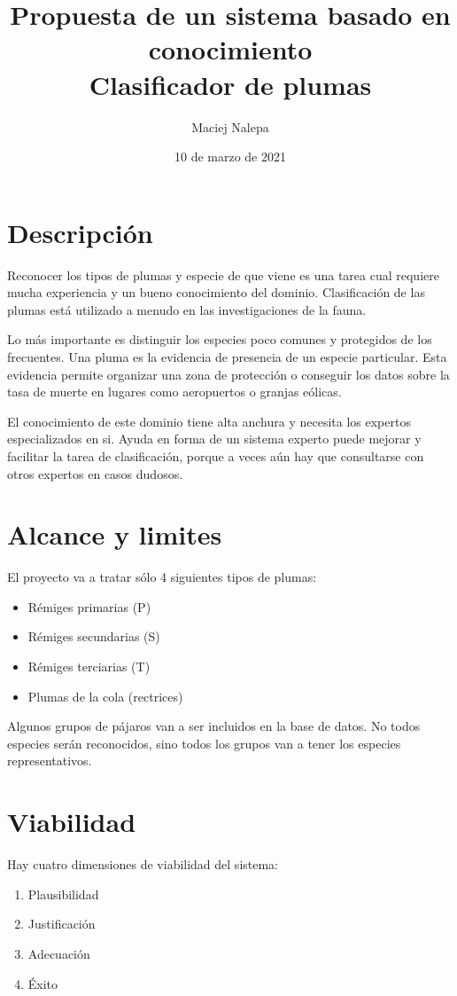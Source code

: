 \documentclass[a4paper,12pt]{article}
\title{Propuesta de un sistema basado en conocimiento\\ \normalsize{Clasificador de plumas}}
\author{Maciej Nalepa}
\date{10 de marzo de 2021}
\begin{document}
\maketitle

\section{Descripción}
Reconocer los tipos de plumas y especie de que viene es una tarea cual requiere mucha experiencia y un bueno conocimiento del dominio.
Clasificación de las plumas está utilizado a menudo en las investigaciones de la fauna.

Lo más importante es distinguir los especies poco comunes y protegidos de los frecuentes.
Una pluma es la evidencia de presencia de un especie particular.
Esta evidencia permite organizar una zona de protección o conseguir los datos sobre la tasa de muerte en lugares como aeropuertos o granjas eólicas.

El conocimiento de este dominio tiene alta anchura y necesita los expertos especializados en si.
Ayuda en forma de un sistema experto puede mejorar y facilitar la tarea de clasificación, porque a veces aún hay que consultarse con otros expertos en casos dudosos.

\section{Alcance y limites}
El proyecto va a tratar sólo 4 siguientes tipos de plumas:
\begin{itemize}
	\item Rémiges primarias (P)
	\item Rémiges secundarias (S)
	\item Rémiges terciarias (T)
	\item Plumas de la cola (rectrices)
\end{itemize}

Algunos grupos de pájaros van a ser incluidos en la base de datos.
No todos especies serán reconocidos, sino todos los grupos van a tener los especies representativos.

\section{Viabilidad}

\noindent Hay cuatro dimensiones de viabilidad del sistema:
\begin{enumerate}
	\item Plausibilidad
	\item Justificación
	\item Adecuación
	\item Éxito
\end{enumerate}
\end{document}

